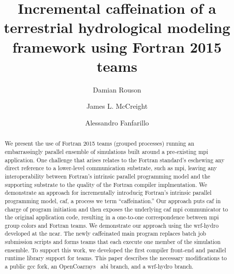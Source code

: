 \documentclass[sigconf, authordraft]{acmart}
\begin{document}
\title{Incremental caffeination of a terrestrial hydrological modeling framework using Fortran 2015 teams}


\author{Damian Rouson}
\renewcommand{\shortauthors}{D. Rouson et al.}

\author{James L. McCreight}

\author{Alessandro Fanfarillo}

\begin{abstract}
We present the use of Fortran 2015 teams (grouped processes) running an embarrassingly
parallel ensemble of simulations built around a pre-existing \gls{mpi} application.  One
challenge that arises relates to the Fortran standard's eschewing any direct reference to
a lower-level communication substrate, such as \gls{mpi}, leaving any interoperability
between Fortran's intrinsic parallel programming model and the supporting substrate to
the quality of the Fortran compiler implmentation.  We demonstrate an approach for
incrementally introducig Fortran's intrinsic parallel programming model, \gls{caf}, a process
we term ``caffeination.''  Our approach puts \gls{caf} in charge of program initiation and
then exposes the underlying \gls{caf} \gls{mpi} communicator to the original application
code,  resulting in a one-to-one correspondence between \gls{mpi} group colors and Fortran
teams.  We demonstrate our approach using the \gls{wrf-hydro} developed at the \gls{ncar}.
The newly caffeinated main program replaces batch job submission scripts and forms teams
that each execute one member of the simulation ensemble.   To support this work, we
developed the first compiler front-end and parallel runtime library support for teams.
This paper describes the necessary modifications to a public \gls{gcc} fork, an
OpenCoarrays~\cite{fanfarillo2014opencoarrays} \gls{abi} branch, and a \gls{wrf-hydro} branch.
\end{abstract}
\end{document}
